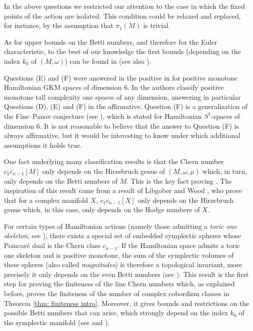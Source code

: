 \documentclass[12pt,a4paper]{amsart}
\theoremstyle{plain}
\theoremstyle{definition}
\begin{document}
In the above questions we restricted our attention to the case in which the fixed points of the action are isolated.  
This condition could be relaxed and replaced, for instance, by the assumption that $\pi_1(M)$ is trivial.

As for upper bounds on the Betti numbers, and therefore for the Euler characteristic, 
to the best of our knowledge the first bounds (depending on the index $k_0$ of
$(M,\omega)$) can be found in \cite[Section 5]{MR3695881} (see also \cite[Section
4]{MR4940256}). 

Questions (E) and (F) were answered in the positive in \cite{ChartonKesslerMonotone} for positive monotone Hamiltonian GKM spaces of dimension 6. In \cite{CSSMonotone} the authors classify 
positive monotone tall complexity one spaces of any dimension, answering in particular Questions (D), (E) and (F) in the affirmative. 
Question (F) is a generalization of the Fine--Panov conjecture (see 
\cite[Conjecture 1.4]{MR3355122}), which is stated for Hamiltonian $S^1$-spaces of dimension 6. It is not reasonable to believe that the answer to Question (F) is always affirmative,
but it would be interesting to know under which additional assumptions it holds true.

\vspace{0.5cm}

One fact underlying many classification results
is that the Chern number $c_1c_{n-1}[M]$ only depends on the Hirzebruch genus of $(M,\omega,\mu)$ which, in turn, only depends on the Betti numbers of $M$.
This is the key fact proving \cite[Corollary 3.1]{MR3230015}.  The inspiration of this result came from a result of Libgober and Wood \cite[Theorem 3]{MR1064869}, who prove that for a complex manifold $X$, $c_1c_{n-1}[X]$ only depends on the Hirzebruch genus which, in this case, only depends on the Hodge numbers of $X$.

For certain types of Hamiltonian actions (namely those admitting a \emph{toric one skeleton}, see \cite[Sections 3 and 4]{MR3695881}), there exists a special set of embedded symplectic spheres whose Poincar\'e dual is the Chern class $c_{n-1}$. 
If the Hamiltonian space admits a toric one skeleton and is positive monotone, the sum of the symplectic volumes of these spheres (also called \emph{magnitudes}) is therefore a topological invariant, more precisely it only depends on the even Betti numbers (see \cite[Theorem 1.5]{MR3695881}). 
This result is the first step for proving the finiteness of the line Chern numbers which, as explained before, proves the finiteness of the number of complex cobordism classes
in Theorem \ref{thm: finiteness intro}.
Moreover, it gives bounds and restrictions on the possible Betti numbers that can arise, which strongly depend on the index $k_0$ of the symplectic manifold (see \cite[Section 5.1]{MR3695881} and \cite[Section 4]{MR4940256}).
\vspace{0.5cm}
\end{document}
